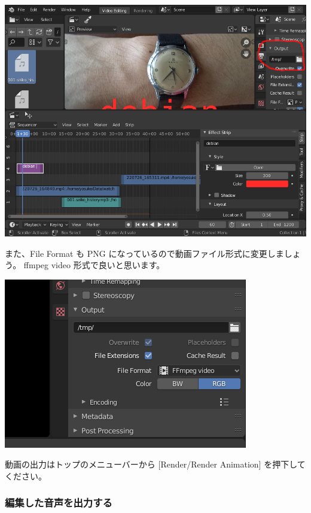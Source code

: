 \documentclass[mingoth,a4paper]{jsarticle}
\begin{document}
\begin{center}
\includegraphics[scale=0.3]{image202209/blender_output.png }
\end{center}

また、File Format も PNG になっているので動画ファイル形式に変更しましょう。
ffmpeg video 形式で良いと思います。

\begin{center}
\includegraphics[scale=0.3]{image202209/blender_output_params.png }
\end{center}

動画の出力はトップのメニューバーから [Render/Render Animation] を押下してください。

\subsubsection{編集した音声を出力する}
\end{document}
